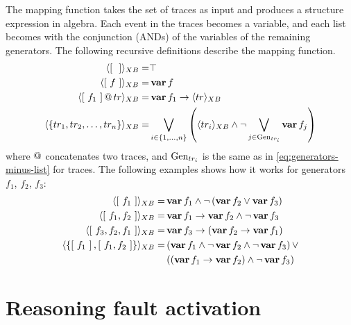 \documentclass[12pt,openright,twoside,a4paper,oldfontcommands,english,brazil,final]{abntex2}
\makeatletter
\theoremstyle{theo}
\def\varop{\ensuremath\operatorname{\mathbf{var}}}
\newcommand{\var}[1]{\ensuremath\varop #1}
\def\xbeforeop{\ensuremath\rightarrow}
\newcommand{\xbefore}[2]{\ensuremath #1 \xbeforeop #2 }
\newcommand{\append}[2]{\ensuremath #1 \operatorname{\mathbf{@}} #2}
\newcommand{\tracetoalgebra}[1]{\ensuremath\langle{#1}\rangle_{XB}}
\newcommand{\trace}[1]{\ensuremath\left[~#1~\right]}
\def\generators{\ensuremath\mathrm{Gen}}
\makeatother
\begin{document}
The mapping function takes the set of traces as input and produces a structure expression in \ac{algebra}.
Each event in the traces becomes a variable, and each list becomes  with the conjunction (\acp{AND}) of the variables of the remaining generators.
The following recursive definitions describe the mapping function.
%
\begin{subequations}
\begin{align}
\tracetoalgebra{\trace{}} = & \top\label{eq:mapping-algebra-empty}\\
%
\tracetoalgebra{\trace{f}} = & \var{f}\label{eq:mapping-algebra-singleton}\\
%
\tracetoalgebra{\append{\trace{f_1}}{tr}} = & 
  \xbefore
    {\var{f_1}}
    {\tracetoalgebra{tr}}\label{eq:mapping-algebra-two-more-trace}\\
%
\tracetoalgebra{\left\{ tr_1, tr_2, \ldots, tr_n  \right\}} =& 
  \bigvee_{i \in \left\{1,\ldots,n\right\}} 
  \left(\tracetoalgebra{tr_i} \land 
  \lnot \bigvee_{j \in \generators_{tr_i}} \var{f_j}\right)\label{eq:mapping-algebra-set}
\end{align}
\end{subequations}
%
where $\append{}{}$ concatenates two traces, and $\generators_{tr_i}$ is the same as in \cref{eq:generators-minus-list} for traces.
The following examples shows how it works for generators $f_1$, $f_2$, $f_3$:
%
\begin{subequations}
\begin{align}
\tracetoalgebra{\trace{f_1}} = & \var{f_1} \land \lnot \left(\var{f_2} \lor \var{f_3}\right)\\
%
\tracetoalgebra{\trace{f_1,f_2}} = & \xbefore{\var{f_1}}{\var{f_2}} \land \lnot \var{f_3}\\
%
\tracetoalgebra{\trace{f_3,f_2,f_1}} = & \xbefore{\var{f_3}}{\left(\xbefore{\var{f_2}}{\var{f_1}}\right)}\\
%
\tracetoalgebra{\left\{\trace{f_1},\trace{f_1,f_2}\right\}} = & 
  \left(\var{f_1} \land \lnot \var{f_2} \land \lnot \var{f_3}\right) \lor \nonumber\\
  & \left(\left(\xbefore{\var{f_1}}{\var{f_2}}\right) \land \lnot \var{f_3}\right)
\end{align}
\end{subequations}

\chapter{Reasoning fault activation}
\label{chap:activation}
\end{document}

